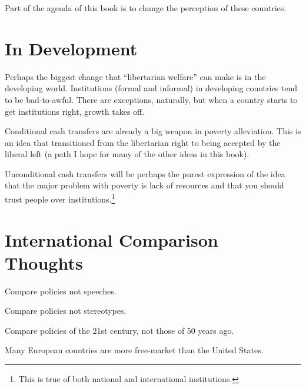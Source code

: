 Part of the agenda of this book is to change the perception of these countries.

\section{In Development}

Perhaps the biggest change that ``libertarian welfare'' can make is in the
developing world. Institutions (formal and informal) in developing countries
tend to be bad-to-awful. There are exceptions, naturally, but when a country
starts to get institutions right, growth takes off.

Conditional cash transfers are already a big weapon in poverty alleviation.
This is an idea that transitioned from the libertarian right to being accepted
by the liberal left (a path I hope for many of the other ideas in this book).

Unconditional cash transfers will be perhaps the purest expression of the idea
that the major problem with poverty is lack of resources and that you should
trust people over institutions.\footnote{This is true of both national and
international institutions.} 

\section{International Comparison Thoughts}

\thought Compare policies not speeches.

\thought Compare policies not stereotypes.

\thought Compare policies of the 21st century, not those of 50 years ago.

\thought Many European countries are more free-market than the United States.

